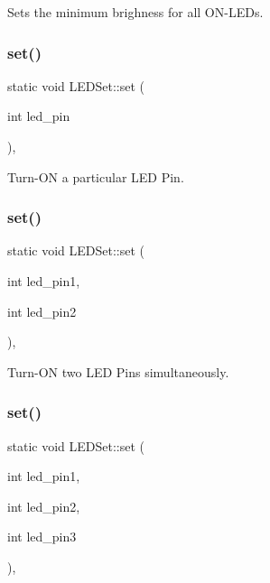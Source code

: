 Sets the minimum brighness for all O\+N-\/\+L\+E\+Ds. \mbox{\label{classLEDSet_a7d1cc1a76c48f90ed581dd06808b672b}} 
\subsubsection{\texorpdfstring{set()}{set()}\hspace{0.1cm}{\footnotesize\ttfamily [1/3]}}
{\footnotesize\ttfamily static void L\+E\+D\+Set\+::set (\begin{DoxyParamCaption}\item[{int}]{led\+\_\+pin }\end{DoxyParamCaption})\hspace{0.3cm}{\ttfamily [inline]}, {\ttfamily [static]}}



Turn-\/\+ON a particular L\+ED Pin. 

\mbox{\label{classLEDSet_abc6b67a569ff0835ac4ccc8f0615af70}} 
\subsubsection{\texorpdfstring{set()}{set()}\hspace{0.1cm}{\footnotesize\ttfamily [2/3]}}
{\footnotesize\ttfamily static void L\+E\+D\+Set\+::set (\begin{DoxyParamCaption}\item[{int}]{led\+\_\+pin1,  }\item[{int}]{led\+\_\+pin2 }\end{DoxyParamCaption})\hspace{0.3cm}{\ttfamily [inline]}, {\ttfamily [static]}}



Turn-\/\+ON two L\+ED Pins simultaneously. 

\mbox{\label{classLEDSet_a011daad7621d4b30d56d685bcff779d0}} 
\subsubsection{\texorpdfstring{set()}{set()}\hspace{0.1cm}{\footnotesize\ttfamily [3/3]}}
{\footnotesize\ttfamily static void L\+E\+D\+Set\+::set (\begin{DoxyParamCaption}\item[{int}]{led\+\_\+pin1,  }\item[{int}]{led\+\_\+pin2,  }\item[{int}]{led\+\_\+pin3 }\end{DoxyParamCaption})\hspace{0.3cm}{\ttfamily [inline]}, {\ttfamily [static]}}



